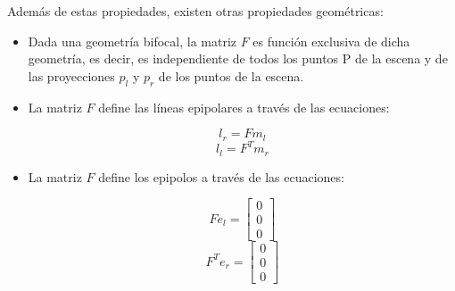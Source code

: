 Además de estas propiedades, existen otras propiedades geométricas:

\begin{itemize}
\item Dada una geometría bifocal, la matriz $F$ es función exclusiva de dicha geometría, es decir, es independiente de todos los puntos P de la escena y de las proyecciones $p_l$ y $p_r$ de los puntos de la escena.
\item La matriz $F$ define las líneas epipolares a través de las ecuaciones:

  \begin{equation}
    l_r=Fm_l
  \end{equation}
  \begin{equation}
    l_l=F^Tm_r
  \end{equation}

\item La matriz $F$ define los epipolos a través de las ecuaciones:

  \begin{equation}
    Fe_l=
    \begin{bmatrix}
      0 \\ 0 \\ 0
    \end{bmatrix}
  \end{equation}
  \begin{equation}
    F^Te_r=
    \begin{bmatrix}
      0 \\ 0 \\ 0
    \end{bmatrix}
  \end{equation}

\end{itemize}






